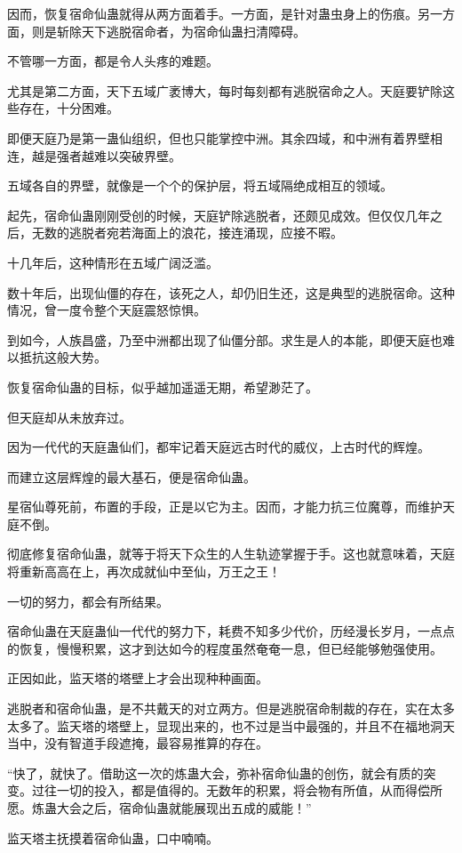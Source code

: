 \begin{this_body}
因而，恢复宿命仙蛊就得从两方面着手。一方面，是针对蛊虫身上的伤痕。另一方面，则是斩除天下逃脱宿命者，为宿命仙蛊扫清障碍。

不管哪一方面，都是令人头疼的难题。

尤其是第二方面，天下五域广袤博大，每时每刻都有逃脱宿命之人。天庭要铲除这些存在，十分困难。

即便天庭乃是第一蛊仙组织，但也只能掌控中洲。其余四域，和中洲有着界壁相连，越是强者越难以突破界壁。

五域各自的界壁，就像是一个个的保护层，将五域隔绝成相互的领域。

起先，宿命仙蛊刚刚受创的时候，天庭铲除逃脱者，还颇见成效。但仅仅几年之后，无数的逃脱者宛若海面上的浪花，接连涌现，应接不暇。

十几年后，这种情形在五域广阔泛滥。

数十年后，出现仙僵的存在，该死之人，却仍旧生还，这是典型的逃脱宿命。这种情况，曾一度令整个天庭震怒惊惧。

到如今，人族昌盛，乃至中洲都出现了仙僵分部。求生是人的本能，即便天庭也难以抵抗这般大势。

恢复宿命仙蛊的目标，似乎越加遥遥无期，希望渺茫了。

但天庭却从未放弃过。

因为一代代的天庭蛊仙们，都牢记着天庭远古时代的威仪，上古时代的辉煌。

而建立这层辉煌的最大基石，便是宿命仙蛊。

星宿仙尊死前，布置的手段，正是以它为主。因而，才能力抗三位魔尊，而维护天庭不倒。

彻底修复宿命仙蛊，就等于将天下众生的人生轨迹掌握于手。这也就意味着，天庭将重新高高在上，再次成就仙中至仙，万王之王！

一切的努力，都会有所结果。

宿命仙蛊在天庭蛊仙一代代的努力下，耗费不知多少代价，历经漫长岁月，一点点的恢复，慢慢积累，这才到达如今的程度虽然奄奄一息，但已经能够勉强使用。

正因如此，监天塔的塔壁上才会出现种种画面。

逃脱者和宿命仙蛊，是不共戴天的对立两方。但是逃脱宿命制裁的存在，实在太多太多了。监天塔的塔壁上，显现出来的，也不过是当中最强的，并且不在福地洞天当中，没有智道手段遮掩，最容易推算的存在。

“快了，就快了。借助这一次的炼蛊大会，弥补宿命仙蛊的创伤，就会有质的突变。过往一切的投入，都是值得的。无数年的积累，将会物有所值，从而得偿所愿。炼蛊大会之后，宿命仙蛊就能展现出五成的威能！”

监天塔主抚摸着宿命仙蛊，口中喃喃。


\end{this_body}
